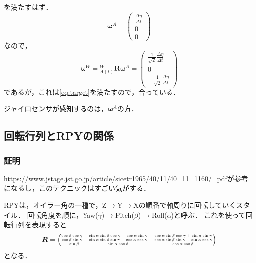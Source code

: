 を満たすはず．
\begin{equation}
  \boldsymbol{\omega}^{A} = \begin{pmatrix}
    \frac{\Delta \eta}{\Delta t}\\
    0\\
    0
  \end{pmatrix}
\end{equation}
なので，
\begin{equation}
  \boldsymbol{\omega}^{W} = {}^{W}_{A(t)}\boldsymbol{R} \boldsymbol{\omega}^{A} = \begin{pmatrix}
    \frac{1}{\sqrt{2}} \frac{\Delta \eta}{\Delta t}\\
    0\\
    -\frac{1}{\sqrt{2}} \frac{\Delta \eta}{\Delta t}
  \end{pmatrix}
\end{equation}
であるが，これは\autoref{eq:target}を満たすので，合っている．

ジャイロセンサが感知するのは，$\boldsymbol{\omega}^{A}$の方．

\subsection{回転行列とRPYの関係}\label{subsec:rpy}
\subsubsection{証明}
\url{https://www.jstage.jst.go.jp/article/sicetr1965/40/11/40_11_1160/_pdf}が参考になるし，このテクニックはすごい気がする．

RPYは，オイラー角の一種で，Z$\to$Y$\to$Xの順番で軸周りに回転していくスタイル．
回転角度を順に，Yaw($\gamma$)$\to$Pitch($\beta$)$\to$Roll($\alpha$)と呼ぶ．
これを使って回転行列を表現すると
\begin{equation}
  \boldsymbol{R} = {\tiny \begin{pmatrix}
      \cos \beta \cos \gamma & \sin \alpha \sin \beta \cos \gamma - \cos \alpha \sin \gamma & \cos \alpha \sin \beta \cos \gamma + \sin \alpha \sin \gamma \\
      \cos \beta \sin \gamma & \sin \alpha \sin \beta \sin \gamma + \cos \alpha \cos \gamma & \cos \alpha \sin \beta \sin \gamma - \sin \alpha \cos \gamma \\
      -\sin \beta & \sin \alpha \cos \beta & \cos \alpha \cos \beta
  \end{pmatrix}}\label{eq:DCM}
\end{equation}
となる．

